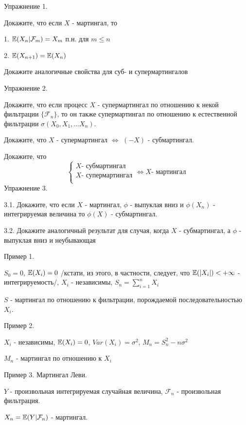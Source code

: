 {Упражнение 1. \par
Докажите, что если $X$ - мартингал, то \par
1. $\mathbb{E}(X_{n}|\mathcal{F}_{m})=X_{m}$ п.н. для $m\le n$ \par
2. $\mathbb{E}(X_{n+1}) = \mathbb{E}(X_{n})$ \par
Докажите аналогичные свойства для суб- и супермартингалов \par

Упражнение 2. \par
Докажите, что если процесс $X$ - супермартингал по отношению к
некой фильтрации $\{ \mathcal{F}_{n} \}$, то он также
супермартингал по отношению к естественной фильтрации
$\sigma(X_{0},X_{1},...X_{n})$. \par
Докажите, что $X$ - супермартингал $\Leftrightarrow$ $(-X)$ -
субмартингал. \par
Докажите, что
$$
\left \{
\begin{array}{rcl}
X \text{- субмартингал} \\
X \text{- супермартингал} \\
\end{array}
\right. \Leftrightarrow X \text{- мартингал}
$$
Упражнение 3. \par
3.1. Докажите, что если $X$ - мартингал, $\phi$ - выпуклая вниз и
$\phi(X_{n})$ - интегрируемая величина то $\phi(X)$ -
субмартингал. \par
3.2. Докажите аналогичный результат для случая, когда $X$ -
субмартингал, а $\phi$ - выпуклая вниз и неубывающая \par

Пример 1. \par
$S_{0}=0$, $\mathbb{E}(X_{i})=0$ /кстати, из этого, в частности, следует,
что $\mathbb{E}(|X_{i}|)<+\infty$ - интегрируемость/, $X_{i}$ - независимы,
$S_{n}=\sum_{i=1}^{n}
X_{i}$ \par
$S$ - мартингал по отношению к фильтрации, порождаемой последовательностью $X_{i}$. \par

Пример 2. \par
$X_{i}$ - независимы, $\mathbb{E}(X_{i})=0$, $Var(X_{i})=\sigma^{2}$,
$M_{n}=S_{n}^{2}-n\sigma^{2}$ \par
$M_{n}$ - мартингал по отношению к $X_{i}$ \par

Пример 3. Мартингал Леви.\par
$Y$ - произвольная интегрируемая случайная величина,
$\mathcal{F}_{n}$ - произвольная фильтрация. \par
$X_{n}=\mathbb{E}(Y|\mathcal{F}_{n})$ - мартингал. \par

}

